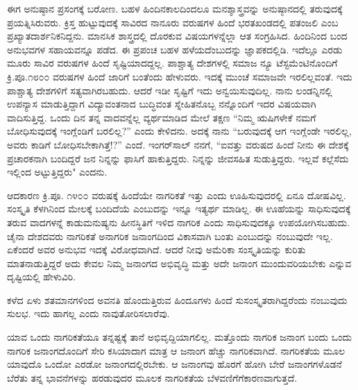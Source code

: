 ಈಗ ಅನುಷ್ಠಾನ ಪ್ರಸಂಗಕ್ಕೆ ಬರೋಣ. ಬಹಳ ಹಿಂದಿನಕಾಲದಿಂದಲೂ ಮನಶ್ಶಾಸ್ತ್ರವನ್ನು ಅನುಷ್ಠಾನದಲ್ಲಿ ತರುವುದಕ್ಕೆ ಪ್ರಯತ್ನಿಸಿರುವರು. ಕ್ರಿಸ್ತ ಹುಟ್ಟುವುದಕ್ಕೆ ಸಾವಿರದ ನಾನೂರು ವರುಷಗಳ ಹಿಂದೆ ಭರತಖಂಡದಲ್ಲಿ ಪತಂಜಲಿ ಎಂಬ ಪ್ರಖ್ಯಾತ\break ದಾರ್ಶನಿಕನಿದ್ದನು. ಮಾನಸಿಕ ಶಾಸ್ತ್ರದಲ್ಲಿ ದೊರಕುವ ವಿಷಯಗಳನ್ನೆಲ್ಲಾ ಆತ ಸಂಗ್ರಹಿಸಿದ. ಹಿಂದಿನಿಂದ ಬಂದ ಅನುಭವಗಳ ಸಹಾಯವನ್ನೂ ಪಡೆದ. ಈ ಪ್ರಪಂಚ ಬಹಳ ಹಳೆಯದೆಂಬುದನ್ನು ಜ್ಞಾಪಕದಲ್ಲಿಡಿ. ಇದೆಲ್ಲೂ ಎರಡು ಮೂರು ಸಾವಿರ ವರುಷಗಳ ಹಿಂದೆ ಸೃಷ್ಟಿಯಾದದ್ದಲ್ಲ. ಪಾಶ್ಚಾತ್ಯ ದೇಶಗಳಲ್ಲಿ ಸಮಾಜ ನ್ಯೂ ಟೆಸ್ಟಮೆಂಟಿನೊಂದಿಗೆ ಕ್ರಿ.ಪೂ.೧೮೦೦ ವರುಷಗಳ ಹಿಂದೆ ಜಾರಿಗೆ ಬಂತೆಂದು ಹೇಳುವರು. ಇದಕ್ಕೆ ಮುಂಚೆ ಸಮಾಜವೇ ಇರಲಿಲ್ಲವಂತೆ. ಇದು ಪಾಶ್ಚಾತ್ಯ ದೇಶಗಳಿಗೆ ಸತ್ಯವಾಗಿರಬಹುದು. ಆದರೆ ಇಡೀ ಸೃಷ್ಟಿಗೆ ಇದು ಅನ್ವಯಿಸುವುದಿಲ್ಲ. ನಾನು ಲಂಡನ್ನಿನಲ್ಲಿ ಉಪನ್ಯಾಸ ಮಾಡುತ್ತಿದ್ದಾಗ ವಿದ್ಯಾವಂತನಾದ ಬುದ್ಧಿವಂತ ಸ್ನೇಹಿತನೊಬ್ಬ ನನ್ನೊಂದಿಗೆ ಇದರ ವಿಷಯವಾಗಿ ವಾದಿಸುತ್ತಿದ್ದ. ಒಂದು ದಿನ ತನ್ನ ವಾದವನ್ನೆಲ್ಲ ವ್ಯರ್ಥಮಾಡಿದ ಮೇಲೆ ತಕ್ಷಣ “ನಿಮ್ಮ ಋಷಿಗಳೇಕೆ ನಮಗೆ ಬೋಧಿಸುವುದಕ್ಕೆ ಇಂಗ್ಲೆಂಡಿಗೆ ಬರಲಿಲ್ಲ?” ಎಂದು ಕೇಳಿದನು. ಅದಕ್ಕೆ ನಾನು “ಬರುವುದಕ್ಕೆ ಆಗ ಇಂಗ್ಲೆಂಡೇ ಇರಲಿಲ್ಲ, ಅವರು ಕಾಡಿಗೆ ಬೋಧಿಸಬೇಕಾಗಿತ್ತೆ!?” ಎಂದೆ. ಇಂಗರ್‌ಸಾಲ್ ನನಗೆ, “ಐವತ್ತು ವರುಷದ ಹಿಂದೆ ನೀನು ಈ ದೇಶಕ್ಕೆ ಪ್ರಚಾರಕನಾಗಿ ಬಂದಿದ್ದರೆ ಜನ ನಿನ್ನನ್ನು ಫಾಸಿಗೆ ಹಾಕುತ್ತಿದ್ದರು. ನಿನ್ನನ್ನು ಜೀವಸಹಿತ ಸುಡುತ್ತಿದ್ದರು. ಇಲ್ಲವೆ ಕಲ್ಲೆಸೆದು ಇಲ್ಲಿಂದ ಅಟ್ಟುತ್ತಿದ್ದರು" ಎಂದನು.

ಆದಕಾರಣ ಕ್ರಿ.ಪೂ. ೧೪೦೦ ವರುಷಕ್ಕೆ ಹಿಂದೆಯೇ ನಾಗರಿಕತೆ ಇತ್ತು ಎಂದು ಊಹಿಸುವುದರಲ್ಲಿ ಏನೂ ದೋಷವಿಲ್ಲ. ಸಂಸ್ಕೃತಿ ಕೆಳಗಿನಿಂದ ಮೇಲಕ್ಕೆ ಬಂದಿದೆಯೆ ಎಂಬುದನ್ನು ಇನ್ನೂ ಇತ್ಯರ್ಥ ಮಾಡಿಲ್ಲ. ಈ ಊಹೆಯನ್ನು ಸಾಧಿಸುವುದಕ್ಕೆ ತರುವ ವಾದಗಳನ್ನೆ ಕಾಡುಮನುಷ್ಯನು ಹೀನಸ್ಥಿತಿಗೆ ಇಳಿದ ನಾಗರಿಕ ಎಂದು ಸಾಧಿಸುವುದಕ್ಕೂ ಉಪಯೋಗಿಸಬಹುದು. ಚೈನಾ ದೇಶದವರು ನಾಗರಿಕತೆ ಅನಾಗರಿಕ ಜನಾಂಗದಿಂದ ವಿಕಾಸವಾಗಿ ಬಂತು ಎಂಬುದನ್ನು ನಂಬುವುದೇ ಇಲ್ಲ. ಏಕೆಂದರೆ ಅವರ ಅನುಭವ ಇದಕ್ಕೆ ವಿರೋಧವಾಗಿದೆ. ಆದರೆ ನೀವು ಅಮೆರಿಕಾ ಸಂಸ್ಕೃತಿಯನ್ನು ಕುರಿತು ಮಾತನಾಡುತ್ತಿದ್ದರೆ ಅದು ಕೇವಲ ನಿಮ್ಮ ಜನಾಂಗದ ಅಭಿವೃದ್ಧಿ ಮತ್ತು ಅದೇ ಜನಾಂಗ ಮುಂದುವರಿಯಬೇಕು ಎನ್ನುವ ದೃಷ್ಟಿಯಲ್ಲಿ ಹೇಳುವಿರಿ.

ಕಳೆದ ಏಳು ಶತಮಾನಗಳಿಂದ ಅವನತಿ ಹೊಂದುತ್ತಿರುವ ಹಿಂದೂಗಳು ಹಿಂದೆ ಸುಸಂಸ್ಕೃತರಾಗಿದ್ದರೆಂದು ನಂಬುವುದು ಸುಲಭ. ಇದು ಹಾಗಲ್ಲ ಎಂದು ನಾವು\break ತೋರಿಸಲಾರೆವು.

ಯಾವ ಒಂದು ನಾಗರಿಕತೆಯೂ ತನ್ನಷ್ಟಕ್ಕೆ ತಾನೆ ಅಭಿವೃದ್ದಿಯಾಗಲಿಲ್ಲ. ಮತ್ತೊಂದು ನಾಗರಿಕ ಜನಾಂಗ ಬಂದು ಒಂದು ನಾಗರಿಕ ಜನಾಂಗದೊಂದಿಗೆ ಸೇರಿ ಕಸಿಯಾದಾಗ ಮಾತ್ರ ಆ ಜನಾಂಗ ಹೆಚ್ಚು ನಾಗರಿಕವಾಗಿದೆ. ನಾಗರಿಕತೆಯ ಮೂಲ ಯಾವುದೊ ಒಂದೋ ಎರಡೋ ಜನಾಂಗದಲ್ಲಿರಬೇಕು. ಆ ಜನಾಂಗವು ಹೊರಗೆ ಹೋಗಿ ಬೇರೆ ಜನಾಂಗಗಳೊಡನೆ ಬೆರೆತು ತನ್ನ ಭಾವನೆಗಳನ್ನು ಹರಡುವುದರ ಮೂಲಕ ನಾಗರಿಕತೆಯ ಬೆಳವಣಿಗೆಗೆ\break ಕಾರಣವಾಗುತ್ತದೆ.

